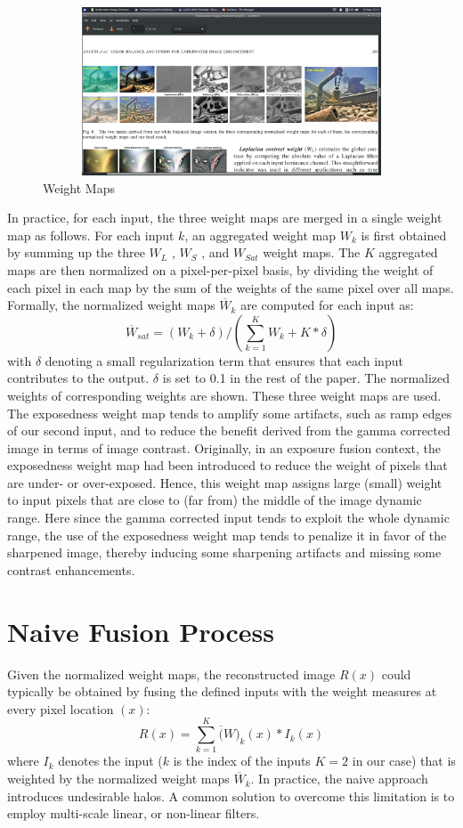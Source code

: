 \documentclass[hidelinks, 12pt]{report}
\begin{document}
\begin{figure}[H]
\centering
\includegraphics[width=15cm,height=5cm]{Weight.png}
\caption[Weight Maps]{Weight Maps}
\label{Weight Maps}
\end{figure}
In practice, for each input, the three weight maps are merged in a single weight map as follows. For each input $k$, an aggregated weight map $W_k$ is first obtained by summing up the three $W_L$ , $W_S$ , and $W_{Sat}$ weight maps. The $K$ aggregated maps are then normalized on a pixel-per-pixel basis, by dividing the weight of each pixel in each map by the sum of the weights of the same pixel over all maps. Formally, the
normalized weight maps $\overline{W}_k$ are computed for each input as:
\begin{equation}
\overline{W}_{sat}=(W_k+\delta)/(\sum_{k=1}^{K}W_k + K*\delta)
\end{equation}
with $\delta$ denoting a small regularization term that ensures that each input contributes to the output. $\delta$ is set to 0.1 in the rest of the paper. The normalized weights of corresponding weights are shown. These three weight maps are used. The exposedness weight map tends to amplify some artifacts, such as ramp edges of our second input, and to reduce the benefit derived from the gamma corrected image in terms of image contrast. Originally, in an exposure fusion context, the exposedness weight map had been introduced to reduce the weight of pixels that are under- or over-exposed. Hence, this weight map assigns large (small) weight to input pixels that are close to (far from) the middle of the image dynamic range. Here since the gamma corrected input tends to exploit the whole dynamic range, the use of the exposedness weight map tends to penalize it in favor of the sharpened image, thereby inducing some sharpening artifacts and missing some contrast enhancements.

\section{Naive Fusion Process}
Given the normalized weight maps, the reconstructed image $R(x)$ could typically be obtained by fusing the defined inputs with the weight measures at every pixel location $(x)$:
\begin{equation}
R(x)=\sum_{k=1}^{K}\overline(W)_k(x)*I_k(x)
\end{equation}
where $I_k$ denotes the input ($k$ is the index of the inputs $K=2$ in our case) that is weighted by the normalized weight maps $\overline{W}_k$. In practice, the naive approach introduces undesirable halos. A common solution to overcome this limitation is to employ multi-scale linear, or non-linear filters.
\end{document}
